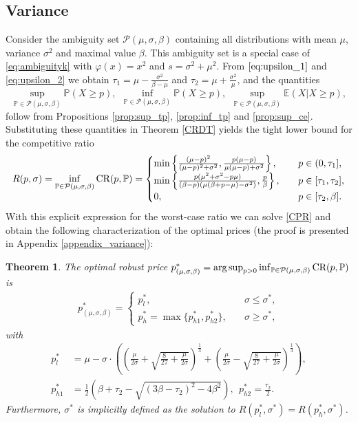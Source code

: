 \documentclass[11pt]{article}
\newtheorem{theorem}{Theorem}[section]
\newcommand{\bP}{\mathbb{P}}
\newcommand{\cP}{\mathcal{P}}
\newcommand{\bE}{\mathbb{E}}
\newcommand{\1}{\mathds{1}}
\begin{document}
\subsection{Variance}\label{sec:var}
Consider the ambiguity set $\cP(\mu,\sigma,\beta)$ containing all distributions with mean $\mu$, variance $\sigma^2$ and maximal value $\beta$. This ambiguity set is a special case of \eqref{eq:ambiguityk} with $\varphi(x) = x^2$ and $s = \sigma^2 + \mu^2$. From $\eqref{eq:upsilon_1}$ and \eqref{eq:upsilon_2} we obtain $\tau_1 = \mu - \frac{\sigma^2}{\beta-\mu}$ and $\tau_2 = \mu + \frac{\sigma^2}{\mu}$, and the quantities $$\sup_{\bP\in\cP(\mu,\sigma,\beta)}\bP(X\geq p), \ \ \inf_{\bP\in\cP(\mu,\sigma,\beta)}\bP(X\geq p), \ \ \sup_{\bP\in\cP(\mu,\sigma,\beta)}\bE(X|X\geq p),$$ follow from Propositions \ref{prop:sup_tp}, \ref{prop:inf_tp} and \ref{prop:sup_ce}.
Substituting these quantities in Theorem \ref{CRDT} yields the tight lower bound for the competitive ratio
$$R(p,\sigma) = \inf_{\bP \in \cP(\mu,\sigma,\beta)}\textup{CR}(p,\bP) = \begin{cases}
     \min\left\{\frac{(\mu-p)^2}{(\mu-p)^2+\sigma^2},\frac{p(\mu-p)}{\mu(\mu-p)+\sigma^2}\right\}, \quad &  p\in(0,\tau_1], \\
     \min\left\{\frac{p(\mu^2+\sigma^2-p\mu)}{(\beta-p)(\mu(\beta+p-\mu)-\sigma^2)},\frac{p}{\beta}\right\}, \quad & p\in[\tau_1,\tau_2], \\
    0, \quad & p \in[\tau_2,\beta].
    \end{cases}$$ 
With this explicit expression for the worst-case ratio we can solve \eqref{CPR} and obtain the following characterization of the optimal prices (the proof is presented in Appendix \ref{appendix_variance}):
\begin{theorem}\label{th:optimal_price_variance}
    The optimal robust price $p_{(\mu,\sigma,\beta)}^*=\arg\sup_{p>0}\inf_{\bP\in\cP(\mu,\sigma,\beta)}\textup{CR}(p,\bP)\nonumber$ is
    \begin{align}
        p_{(\mu,\sigma,\beta)}^* = \begin{cases}
            p_l^*, \quad & \sigma \leq \sigma^{*}, \\
            p_h^* = \max\{p_{h1}^*,p_{h2}^*\}, \quad &    \sigma \geq \sigma^{*},
        \end{cases}
    \end{align}
with
\begin{align}
    p_{l}^*&=\mu - \sigma \cdot \left(\left(\frac{\mu}{2\sigma}+\sqrt{\frac{8}{27}+\frac{\mu}{2\sigma}}\right)^{\frac{1}{3}}+\left(\frac{\mu}{2\sigma}-\sqrt{\frac{8}{27}+\frac{\mu}{2\sigma}}\right)^{\frac{1}{3}}\right),\\
    p_{h1}^* &= \frac{1}{2}\left(\beta+\tau_2-\sqrt{(3\beta-\tau_2)^2-4\beta^2}\right),\ \ p_{h2}^* = \frac{\tau_2}{2}.
\end{align}
Furthermore, $\sigma^*$ is implicitly defined as the solution to
$R(p_l^*,\sigma^*) = R(p_h^*,\sigma^*)$. 
\end{theorem}
\end{document}
